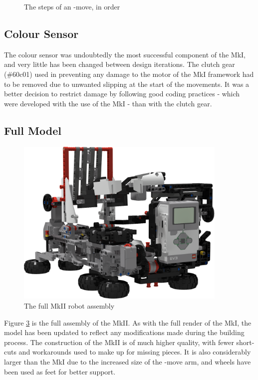 \documentclass{report}
\newcommand{\legopiece}[1]{(\##1)}
\newcommand{\move}[1]{\uppercase{\texttt{\formatmovesnospace{#1}}}-move}
\begin{document}
\begin{figure}[H]
\begin{subfigure}[b]{0.25\textwidth}
    		\caption{}
    		\label{fig:rdrXMoveArmRaised}
    	\end{subfigure}
    	\caption{The steps of an \move{x}, in order}
    	\label{fig:rdrXMoveRenders}
    \end{figure}
    
    
    \subsection{Colour Sensor}
    
    The colour sensor was undoubtedly the most successful component of the MkI, and very little has been changed between design iterations. The clutch gear \legopiece{60c01} used in preventing any damage to the motor of the MkI framework had to be removed due to unwanted slipping at the start of the movements. It was a better decision to restrict damage by following good coding practices - which were developed with the use of the MkI - than with the clutch gear.
    
    \subsection{Full Model}
    
   	\begin{figure}[H]
    	\centering
   		\includegraphics[width=0.9\textwidth]{Resources/Images/rdrMkIIFull.png}
   		\caption{The full MkII robot assembly}
   		\label{fig:rdrMkIIFull}
    \end{figure}
    
    Figure \ref{fig:rdrMkIIFull} is the full assembly of the MkII. As with the full render of the MkI, the model has been updated to reflect any modifications made during the building process. The construction of the MkII is of much higher quality, with fewer short-cuts and workarounds used to make up for missing pieces. It is also considerably larger than the MkI due to the increased size of the \move{x} arm, and wheels have been used as feet for better support.
    
\end{document}
